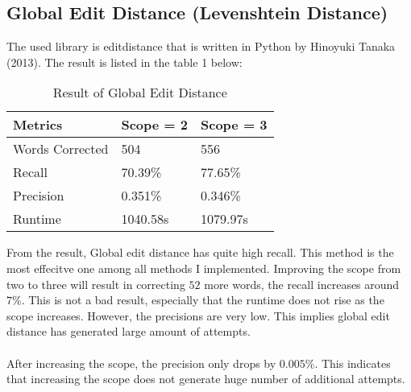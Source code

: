 \documentclass[11pt]{article}
\begin{document}
  \subsection{Global Edit Distance (Levenshtein Distance)}
  The used library is editdistance that is written in Python by Hinoyuki Tanaka
  (2013). The result is listed in the table 1 below:
    \begin{table}[h]
      \begin{center}
        \begin{tabular}{|l|l|l|}
          \hline
          Metrics & Scope = 2 & Scope = 3\\
          \hline\hline
          Words Corrected & 504 & 556\\
          \hline
          Recall & 70.39\% & 77.65\% \\
          \hline
          Precision & 0.351\% & 0.346\% \\
          \hline
          Runtime & 1040.58s & 1079.97s\\
          \hline
        \end{tabular}
        \caption{Result of Global Edit Distance}\label{table1}
      \end{center}
    \end{table}

    From the result, Global edit distance has quite high recall. This method
    is the most effecitve one among all methods I implemented.
    Improving the scope from two to three will result in correcting $52$ more
    words, the recall increases around $7\%$. This is not a bad result,
    especially that the runtime does not rise as the scope increases.
    However, the precisions are very low. This implies global edit distance
    has generated large amount of attempts.
    \paragraph{}
    After increasing the scope, the precision only drops by $0.005\%$.
    This indicates that increasing the scope does not
    generate huge number of additional attempts.
\end{document}
